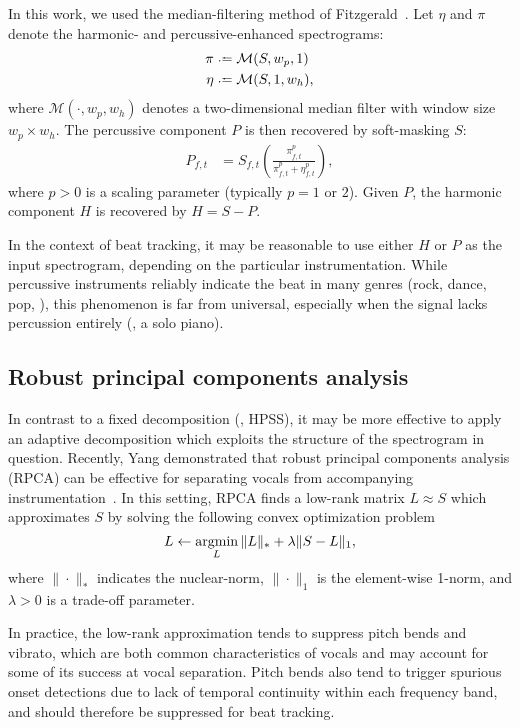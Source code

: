 \documentclass{article}
\begin{document}
In this work, we used the median-filtering method of 
Fitzgerald~\cite{fitzgerald2010harmonic}.  Let $\eta$ and $\pi$ denote the harmonic-
and percussive-enhanced spectrograms:
\begin{align*}
\pi  &\defeq \mathcal{M}(S, w_p, 1)\\
\eta &\defeq \mathcal{M}(S, 1, w_h),
\end{align*}
where $\mathcal{M}(\cdot, w_p, w_h)$ denotes a two-dimensional median filter with window 
size $w_p\times w_h$.
The percussive component $P$ is then recovered by soft-masking $S$:
\begin{align*}
P_{f,t} &= S_{f,t} \left(\frac{ \pi_{f,t}^p }{\pi_{f,t}^p + \eta_{f,t}^p}\right),
\end{align*}
where $p>0$ is a scaling parameter (typically $p=1$ or $2$). Given $P$, the harmonic 
component $H$ is recovered by ${H=S-P}$.

In the context of beat tracking, it may be reasonable to use either $H$ or $P$ as the
input spectrogram, depending on the particular instrumentation. While percussive
instruments reliably indicate the beat in many genres (rock, dance, pop, \etc), this
phenomenon is far from universal, especially when the signal lacks percussion entirely
(\eg, a solo piano).

\subsection{Robust principal components analysis}
In contrast to a fixed decomposition (\ie, HPSS), it may be more effective to apply an
adaptive decomposition which exploits the structure of the spectrogram in question.
Recently, Yang demonstrated that robust principal components analysis (RPCA) can be
effective for separating vocals from accompanying instrumentation~\cite{yang2012sparse, 
candes2011robust}.  In this setting, RPCA finds a low-rank matrix $L \approx S$ which
approximates $S$ by solving the following convex optimization problem
\begin{equation}
L \leftarrow \operatorname*{argmin}_L \|L\|_* + \lambda \|S - L\|_1,
\end{equation}
where $\|\cdot\|_*$ indicates the nuclear-norm, $\|\cdot\|_1$ is the element-wise
1-norm, and $\lambda>0$ is a trade-off parameter.

In practice, the low-rank approximation tends to suppress pitch bends and vibrato,
which are both common characteristics of vocals and may account for some of its success
at vocal separation.  Pitch bends also tend to trigger spurious onset 
detections due to lack of temporal continuity within each frequency band, and should
therefore be suppressed for beat tracking.  
\end{document}
